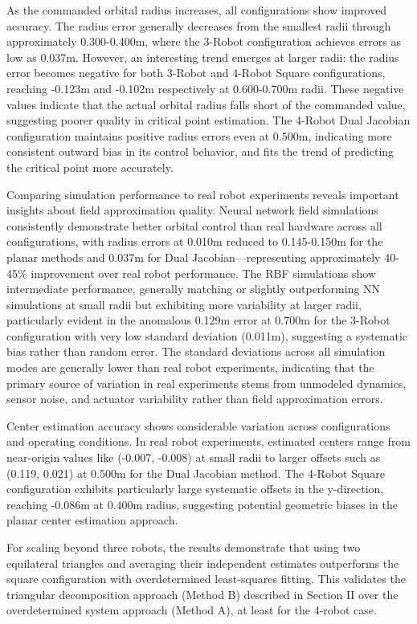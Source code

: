 \documentclass[lettersize,journal]{IEEEtran}
\begin{document}
As the commanded orbital radius increases, all configurations show improved accuracy. The radius error generally decreases from the smallest radii through approximately 0.300-0.400m, where the 3-Robot configuration achieves errors as low as 0.037m. However, an interesting trend emerges at larger radii: the radius error becomes negative for both 3-Robot and 4-Robot Square configurations, reaching -0.123m and -0.102m respectively at 0.600-0.700m radii. These negative values indicate that the actual orbital radius falls short of the commanded value, suggesting poorer quality in critical point estimation. The 4-Robot Dual Jacobian configuration maintains positive radius errors even at 0.500m, indicating more consistent outward bias in its control behavior, and fits the trend of predicting the critical point more accurately.

Comparing simulation performance to real robot experiments reveals important insights about field approximation quality. Neural network field simulations consistently demonstrate better orbital control than real hardware across all configurations, with radius errors at 0.010m reduced to 0.145-0.150m for the planar methods and 0.037m for Dual Jacobian—representing approximately 40-45\% improvement over real robot performance. The RBF simulations show intermediate performance, generally matching or slightly outperforming NN simulations at small radii but exhibiting more variability at larger radii, particularly evident in the anomalous 0.129m error at 0.700m for the 3-Robot configuration with very low standard deviation (0.011m), suggesting a systematic bias rather than random error. The standard deviations across all simulation modes are generally lower than real robot experiments, indicating that the primary source of variation in real experiments stems from unmodeled dynamics, sensor noise, and actuator variability rather than field approximation errors.

Center estimation accuracy shows considerable variation across configurations and operating conditions. In real robot experiments, estimated centers range from near-origin values like (-0.007, -0.008) at small radii to larger offsets such as (0.119, 0.021) at 0.500m for the Dual Jacobian method. The 4-Robot Square configuration exhibits particularly large systematic offsets in the y-direction, reaching -0.086m at 0.400m radius, suggesting potential geometric biases in the planar center estimation approach. 

For scaling beyond three robots, the results demonstrate that using two equilateral triangles and averaging their independent estimates outperforms the square configuration with overdetermined least-squares fitting. This validates the triangular decomposition approach (Method B) described in Section II over the overdetermined system approach (Method A), at least for the 4-robot case.
\end{document}
